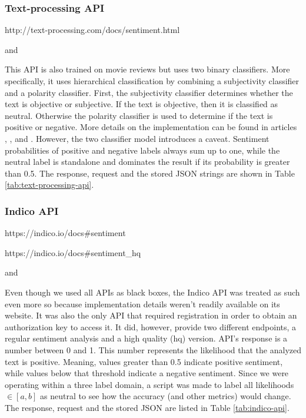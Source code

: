 \subsubsection*{Text-processing API}
\begin{description}
\singlespacing
 \item[Web url:] http://text-processing.com/docs/sentiment.html
 \item[Database columns:]  and 
\end{description}
This API is also trained on movie reviews but uses two binary classifiers. More specifically, it uses hierarchical classification by combining a subjectivity classifier and a polarity classifier. First, the subjectivity classifier determines whether the text is objective or subjective. If the text is objective, then it is classified as neutral. Otherwise the polarity classifier is used to determine if the text is positive or negative.  More details on the implementation can be found in articles  \cite{NaiveBayes}, \cite{Stopwords}, \cite{LowInformationFeatures} and \cite{HierarchicalClassification}.
However, the two classifier model introduces a caveat. Sentiment probabilities of positive and negative labels always sum up to one, while the neutral label is standalone and dominates the result if its probability is greater than 0.5.
The response, request and the stored JSON strings are shown in Table \ref{tab:text-processing-api}.


\newpage

\subsubsection*{Indico API}
\begin{description}
\singlespacing
 \item[Web url:] https://indico.io/docs\#sentiment 
 \item[Web url (hq):] https://indico.io/docs\#sentiment\_hq 
 \item[Database columns:]  and 
\end{description}
Even though we used all APIs as black boxes, the Indico API was treated as such even more so because implementation details weren't readily available on its website. 
It was also the only API that required registration in order to obtain an authorization key to access it. 
It did, however, provide two different endpoints, a regular sentiment analysis and a high quality (hq) version.
API's response is a number between 0 and 1. 
This number represents the likelihood that the analyzed text is positive. 
Meaning, values greater than 0.5 indicate positive sentiment, while values below that threshold indicate a negative sentiment. 
Since we were operating within a three label domain, a script was made to label all likelihoods $\in[a,b]$ as neutral to see how the accuracy (and other metrics) would change.
The response, request and the stored JSON are listed in Table \ref{tab:indico-api}.


